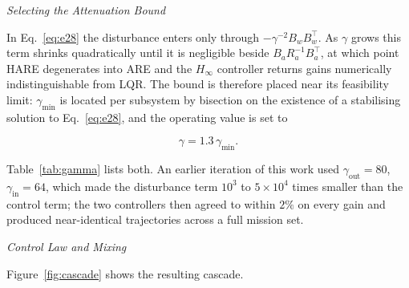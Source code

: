 \documentclass[10pt,letterpaper]{article}
\newcommand{\headingthree}[1]{%
    \par\vspace{6pt}%
    {\centering\fontsize{10}{12}\selectfont\itshape #1\par}%
    \vspace{2pt}\noindent\ignorespaces}
\begin{document}
\headingthree{Selecting the Attenuation Bound}

In Eq.~\eqref{eq:e28} the disturbance enters only through $-\gamma^{-2}B_wB_w^{\!\top}$. As $\gamma$
grows this term shrinks quadratically until it is negligible beside
$B_aR_a^{-1}B_a^{\!\top}$, at which point HARE degenerates into ARE and the $H_\infty$
controller returns gains numerically indistinguishable from LQR. The bound is therefore
placed near its feasibility limit: $\gamma_{\min}$ is located per subsystem by bisection on
the existence of a stabilising solution to Eq.~\eqref{eq:e28}, and the operating value is set to

\begin{equation}
    \label{eq:e31}
    \gamma=1.3\,\gamma_{\min}.
\end{equation}

Table~\ref{tab:gamma} lists both. An earlier iteration of this work used
$\gamma_{\mathrm{out}}=80$, $\gamma_{\mathrm{in}}=64$, which made the disturbance term
$10^3$ to $5\times 10^4$ times smaller than the control term; the two controllers then
agreed to within $2\%$ on every gain and produced near-identical trajectories across a full
mission set.

\headingthree{Control Law and Mixing}

Figure~\ref{fig:cascade} shows the resulting cascade.
\end{document}
